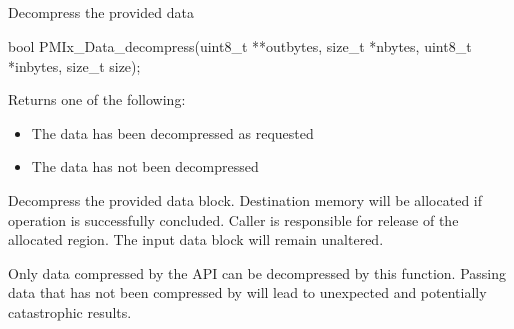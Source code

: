 \subsection{}

\summary

Decompress the provided data

\format

\cspecificstart
\begin{codepar}
bool
PMIx_Data_decompress(uint8_t **outbytes, size_t *nbytes,
                     uint8_t *inbytes, size_t size);
\end{codepar}
\cspecificend

\begin{arglist}
\end{arglist}

Returns one of the following:
\begin{itemize}
\item {} The data has been decompressed as requested
\item {} The data has not been decompressed
\end{itemize}

\descr

Decompress the provided data block. Destination memory
will be allocated if operation is successfully concluded. Caller
is responsible for release of the allocated region. The input
data block will remain unaltered.

Only data compressed by the  \ac{API}
can be decompressed by this function. Passing data that has not
been compressed by  will lead to
unexpected and potentially catastrophic results.

